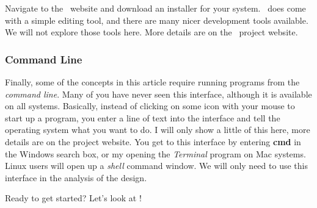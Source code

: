 Navigate to the \PY\ website \cite{python} and download an installer for your
system. \PY\ does come with a simple editing tool, and there are many nicer
development tools available. We will not explore those tools here. More details
are on the \MM\ project website.

\subsubsection{Command Line}

Finally, some of the concepts in this article require running programs from the
{\it command line}. Many of you have never seen this interface, although it is
available on all systems. Basically, instead of clicking on some icon with your
mouse to start up a program, you enter a line of text into the interface and
tell the operating system what you want to do. I will only show a little of
this  here, more details are on the project website. You get to this interface
by entering {\bf cmd} in the Windows search box, or my opening the {\it
Terminal} program on  Mac systems. Linux users will open up a {\it shell}
command window. We will only need to use this interface in the analysis of the
design.


Ready to get started? Let's look at \osc!


